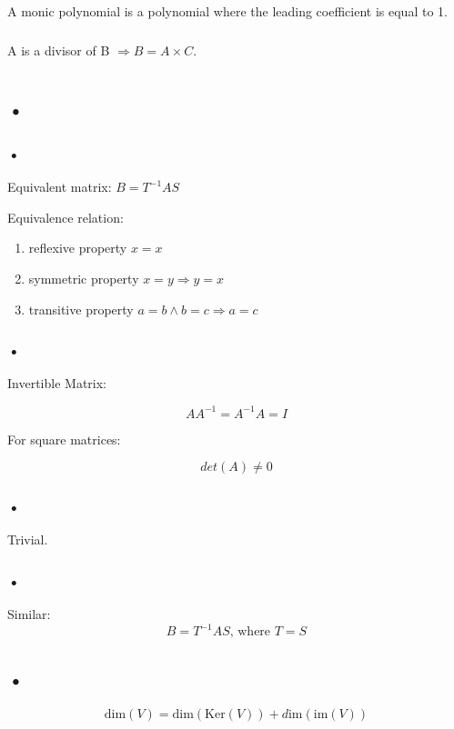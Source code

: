 \documentclass{report}
\newcommand{\dim}{\textrm{dim}}
\newcommand{\Ker}{\textrm{Ker}}
\newcommand{\im}{\textrm{im}}
\begin{document}
\section{}

\subsection{}
A monic polynomial is a polynomial where the leading coefficient is equal to 1.
\subsection{}
A is a divisor of B $\Rightarrow B=A\times C$.

\chapter{}
\section{•}
\subsection{•}
Equivalent matrix:
$B=T^{-1}AS$

Equivalence relation:
\begin{enumerate}
\item reflexive property $x=x$
\item symmetric property $x=y \Rightarrow y=x$
\item transitive property $a=b \land b=c \Rightarrow a=c$
\end{enumerate}
\subsection{•}
Invertible Matrix:

$$AA^{-1}=A^{-1}A=I$$

For square matrices:

$$det(A) \neq 0$$
\subsection{•}
Trivial.
\subsection{•}
Similar:
$$B=T^{-1}AS\textrm{, where }T=S$$

\section{•}
$$\dim(V)=\dim(\Ker(V))+d\im(\im(V))$$
\end{document}
